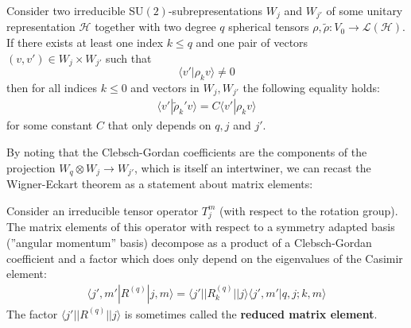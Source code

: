     \begin{theorem}
        Consider two irreducible SU$(2)$-subrepresentations $W_j$ and $W_{j'}$ of some unitary representation $\mathcal{H}$ together with two degree $q$ spherical tensors $\rho, \tilde{\rho}:V_0\rightarrow\mathcal{L}(\mathcal{H})$. If there exists at least one index $k\leq q$ and one pair of vectors $(v, v')\in W_j\times W_{j'}$ such that \[\langle v'|\rho_k v\rangle\neq 0\] then for all indices $k\leq 0$ and vectors in $W_j, W_{j'}$ the following equality holds:
        \begin{gather}
            \langle v'|\tilde{\rho}_k' v\rangle = C\langle v'|\rho_k v\rangle
        \end{gather}
        for some constant $C$ that only depends on $q, j$ and $j'$.
    \end{theorem}
    By noting that the Clebsch-Gordan coefficients are the components of the projection $W_q\otimes W_j\rightarrow W_{j'}$, which is itself an intertwiner, we can recast the Wigner-Eckart theorem as a statement about matrix elements:
    \begin{result}
        Consider an irreducible tensor operator $T_j^m$ (with respect to the rotation group). The matrix elements of this operator with respect to a symmetry adapted basis (''angular momentum'' basis) decompose as a product of a Clebsch-Gordan coefficient and a factor which does only depend on the eigenvalues of the Casimir element:
        \begin{gather}
            \langle j', m'|R^{(q)}|j, m\rangle = \langle j'||R_k^{(q)}||j\rangle\langle j', m'|q,j;k,m\rangle
        \end{gather}
        The factor $\langle j'||R^{(q)}||j\rangle$ is sometimes called the \textbf{reduced matrix element}.
    \end{result}

